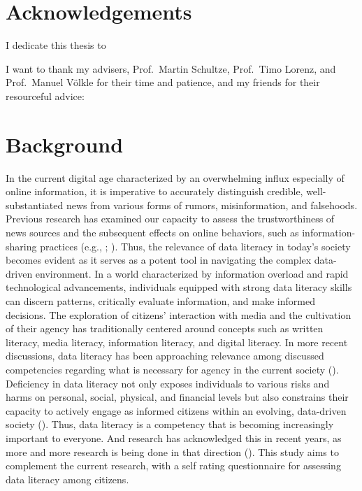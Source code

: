 \documentclass[
  12pt,
  a4paper,
  twoside]{article}
\begin{document}
\section*{Acknowledgements}\label{acknowledgements}

I dedicate this thesis to

I want to thank my advisers, Prof.~Martin Schultze, Prof.~Timo Lorenz, and Prof.~Manuel Völkle for their time and patience, and my friends for their resourceful advice:

\newpage\null\thispagestyle{empty}\newpage

\section{Background}\label{background}

In the current digital age characterized by an overwhelming influx especially of online information, it is imperative to accurately distinguish credible, well-substantiated news from various forms of rumors, misinformation, and falsehoods. Previous research has examined our capacity to assess the trustworthiness of news sources and the subsequent effects on online behaviors, such as information-sharing practices (e.g., ; ).
Thus, the relevance of data literacy in today's society becomes evident as it serves as a potent tool in navigating the complex data-driven environment. In a world characterized by information overload and rapid technological advancements, individuals equipped with strong data literacy skills can discern patterns, critically evaluate information, and make informed decisions.
The exploration of citizens' interaction with media and the cultivation of their agency has traditionally centered around concepts such as written literacy, media literacy, information literacy, and digital literacy. In more recent discussions, data literacy has been approaching relevance among discussed competencies regarding what is necessary for agency in the current society (). Deficiency in data literacy not only exposes individuals to various risks and harms on personal, social, physical, and financial levels but also constrains their capacity to actively engage as informed citizens within an evolving, data-driven society (). Thus, data literacy is a competency that is becoming increasingly important to everyone. And research has acknowledged this in recent years, as more and more research is being done in that direction (). This study aims to complement the current research, with a self rating questionnaire for assessing data literacy among citizens.
\end{document}
